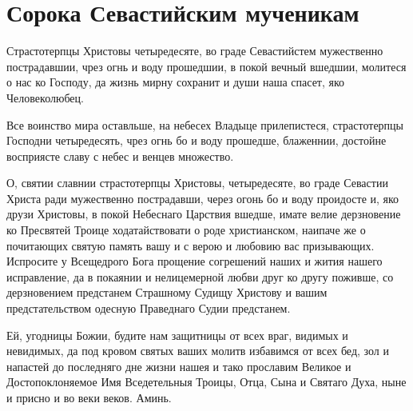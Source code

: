 \mychapterending





\section{Сорока Севастийским мученикам}\begin{mymulticols}




Страстотерпцы Христовы четыредесяте, во граде Севастийстем мужественно пострадавшии, чрез огнь и воду прошедшии, в покой вечный вшедшии, молитеся о нас ко Господу, да жизнь мирну сохранит и души наша спасет, яко Человеколюбец.




Все воинство мира оставльше, на небесех Владыце прилепистеся, страстотерпцы Господни четыредесять, чрез огнь бо и воду прошедше, блаженнии, достойне восприясте славу с небес и венцев множество.




О, святии славнии страстотерпцы Христовы, четыредесяте, во граде Севастии Христа ради мужественно пострадавши, через огонь бо и воду проидосте и, яко друзи Христовы, в покой Небеснаго Царствия вшедше, имате велие дерзновение ко Пресвятей Троице ходатайствовати о роде христианском, наипаче же о почитающих святую память вашу и с верою и любовию вас призывающих. Испросите у Всещедрого Бога прощение согрешений наших и жития нашего исправление, да в покаянии и нелицемерной любви друг ко другу поживше, со дерзновением предстанем Страшному Судищу Христову и вашим предстательством одесную Праведнаго Судии предстанем.

Ей, угодницы Божии, будите нам защитницы от всех враг, видимых и невидимых, да под кровом святых ваших молитв избавимся от всех бед, зол и напастей до последняго дне жизни нашея и тако прославим Великое и Достопоклоняемое Имя Вседетельныя Троицы, Отца, Сына и Святаго Духа, ныне и присно и во веки веков. Аминь.



\end{mymulticols}

\mychapterending


